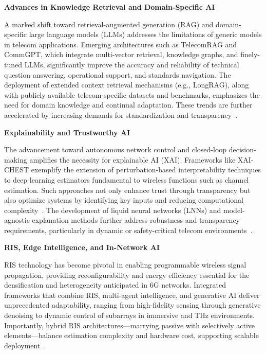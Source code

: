\documentclass[sigconf]{acmart}
\begin{document}
\textbf{Advances in Knowledge Retrieval and Domain-Specific AI}

A marked shift toward retrieval-augmented generation (RAG) and domain-specific large language models (LLMs) addresses the limitations of generic models in telecom applications. Emerging architectures such as TelecomRAG and CommGPT, which integrate multi-vector retrieval, knowledge graphs, and finely-tuned LLMs, significantly improve the accuracy and reliability of technical question answering, operational support, and standards navigation. The deployment of extended context retrieval mechanisms (e.g., LongRAG), along with publicly available telecom-specific datasets and benchmarks, emphasizes the need for domain knowledge and continual adaptation. These trends are further accelerated by increasing demands for standardization and transparency~\cite{ref13, ref14, ref15, ref16, ref17, ref18, ref19, ref20}.

\textbf{Explainability and Trustworthy AI}

The advancement toward autonomous network control and closed-loop decision-making amplifies the necessity for explainable AI (XAI). Frameworks like XAI-CHEST exemplify the extension of perturbation-based interpretability techniques to deep learning estimators fundamental to wireless functions such as channel estimation. Such approaches not only enhance trust through transparency but also optimize systems by identifying key inputs and reducing computational complexity~\cite{ref43, ref44, ref45, ref46, ref47, ref48, ref49}. The development of liquid neural networks (LNNs) and model-agnostic explanation methods further address robustness and transparency requirements, particularly in dynamic or safety-critical telecom environments~\cite{ref43}.

\textbf{RIS, Edge Intelligence, and In-Network AI}

RIS technology has become pivotal in enabling programmable wireless signal propagation, providing reconfigurability and energy efficiency essential for the densification and heterogeneity anticipated in 6G networks. Integrated frameworks that combine RIS, multi-agent intelligence, and generative AI deliver unprecedented adaptability, ranging from high-fidelity sensing through generative denoising to dynamic control of subarrays in immersive and THz environments. Importantly, hybrid RIS architectures—marrying passive with selectively active elements—balance estimation complexity and hardware cost, supporting scalable deployment~\cite{ref28, ref29, ref30, ref31, ref32, ref33, ref34}.
\end{document}
